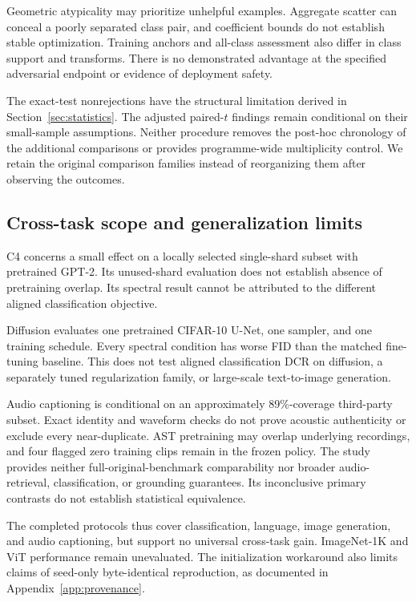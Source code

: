 \documentclass[a4paper,fleqn]{cas-dc}
\begin{document}
Geometric atypicality may prioritize unhelpful examples.
Aggregate scatter can conceal a poorly separated class pair,
and coefficient bounds do not establish stable optimization.
Training anchors and all-class assessment also differ in
class support and transforms.
There is no demonstrated advantage at the specified
adversarial endpoint or evidence of deployment safety.

The exact-test nonrejections have the structural limitation
derived in Section~\ref{sec:statistics}.
The adjusted paired-$t$ findings remain conditional on their
small-sample assumptions.
Neither procedure removes the post-hoc chronology of the
additional comparisons or provides programme-wide multiplicity control.
We retain the original comparison families instead of
reorganizing them after observing the outcomes.

\subsection{Cross-task scope and generalization limits}
\label{sec:extensions}

C4 concerns a small effect on a locally selected single-shard
subset with pretrained GPT-2.
Its unused-shard evaluation does not establish absence
of pretraining overlap.
Its spectral result cannot be attributed to the different
aligned classification objective.

Diffusion evaluates one pretrained CIFAR-10 U-Net,
one sampler, and one training schedule.
Every spectral condition has worse FID than the matched
fine-tuning baseline. This does not test aligned
classification DCR on diffusion, a separately tuned
regularization family, or large-scale text-to-image generation.

Audio captioning is conditional on an approximately
89\%-coverage third-party subset.
Exact identity and waveform checks do not prove acoustic
authenticity or exclude every near-duplicate.
AST pretraining may overlap underlying recordings,
and four flagged zero training clips remain in the frozen
policy. The study provides neither full-original-benchmark
comparability nor broader audio-retrieval, classification,
or grounding guarantees.
Its inconclusive primary contrasts do not establish
statistical equivalence.

The completed protocols thus cover classification, language,
image generation, and audio captioning, but support no
universal cross-task gain.
ImageNet-1K and ViT performance remain unevaluated.
The initialization workaround also limits claims of
seed-only byte-identical reproduction, as documented in
Appendix~\ref{app:provenance}.
\end{document}
